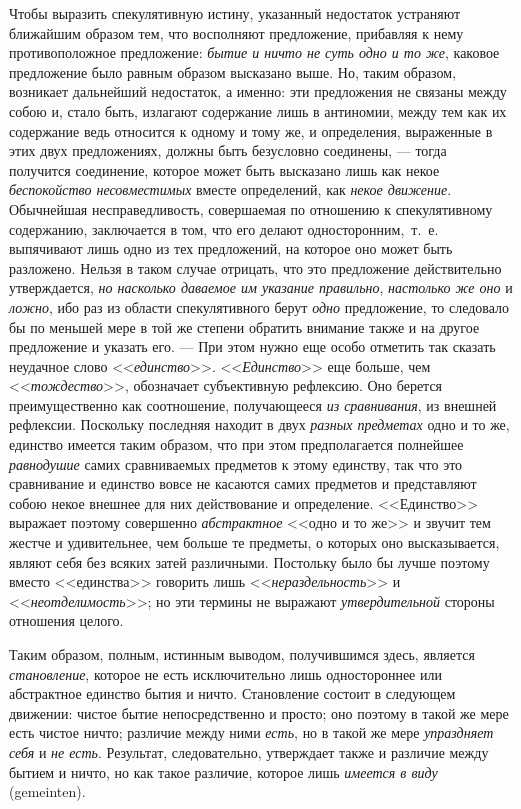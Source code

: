 Чтобы выразить спекулятивную истину, указанный недостаток устраняют
ближайшим образом тем, что восполняют предложение, прибавляя к нему
противоположное предложение: {\em бытие и ничто не суть
одно и то же}, каковое предложение было равным образом высказано выше. Но,
таким образом, возникает дальнейший недостаток, а именно: эти предложения
не связаны между собою и, стало быть, излагают содержание лишь в антиномии,
между тем как их содержание ведь относится к одному и тому же, и
определения, выраженные в этих двух предложениях, должны быть безусловно
соединены, --- тогда получится соединение, которое может быть высказано лишь
как некое {\em беспокойство несовместимых} вместе
определений, как {\em некое движение}. Обычнейшая
несправедливость, совершаемая по отношению к спекулятивному содержанию,
заключается в том, что его делают односторонним,~т.~е. выпячивают лишь одно
из тех предложений, на которое оно может быть разложено. Нельзя в таком
случае отрицать, что это предложение действительно утверждается,
{\em но насколько даваемое им указание правильно},
{\em настолько же оно} и
{\em ложно}, ибо раз из области спекулятивного берут
{\em одно} предложение, то следовало бы по меньшей мере
в той же степени обратить внимание также и на другое предложение и указать
его. --- При этом нужно еще особо отметить так сказать неудачное слово
<<{\em единство}>>. <<{\em Единство}>>
еще больше, чем <<{\em тождество}>>, обозначает
субъективную рефлексию. Оно берется преимущественно как соотношение,
получающееся {\em из сравнивания}, из внешней
рефлексии. Поскольку последняя находит в двух
{\em разных предметах} одно и то же, единство имеется
таким образом, что при этом предполагается полнейшее
{\em равнодушие} самих сравниваемых предметов к этому
единству, так что это сравнивание и единство вовсе не касаются самих
предметов и представляют собою некое внешнее для них действование и
определение. <<Единство>> выражает поэтому совершенно
{\em абстрактное} <<одно и то же>> и звучит тем жестче и
удивительнее, чем больше те предметы, о которых оно высказывается, являют
себя без всяких затей различными. Постольку было бы лучше поэтому вместо
<<единства>> говорить лишь <<{\em нераздельность}>> и
<<{\em неотделимость}>>; но эти термины не выражают
{\em утвердительной} стороны отношения целого.

Таким образом, полным, истинным выводом, получившимся здесь, является
{\em становление}, которое не есть исключительно лишь
одностороннее или абстрактное единство бытия и ничто. Становление состоит в
следующем движении: чистое бытие непосредственно и просто; оно поэтому в
такой же мере есть чистое ничто; различие между ними
{\em есть}, но в такой же мере
{\em упраздняет себя} и {\em не
есть}. Результат, следовательно, утверждает также и различие между бытием и
ничто, но как такое различие, которое лишь {\em имеется
в виду} (gemeinten).

